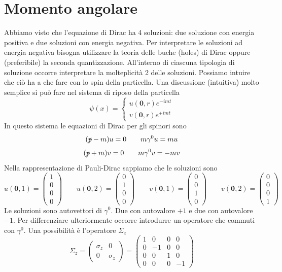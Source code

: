 \section{Momento angolare}
Abbiamo visto che l'equazione di Dirac ha 4 soluzioni: due soluzione con energia positiva e due soluzioni con energia negativa. Per interpretare le soluzioni ad energia negativa bisogna utilizzare la teoria delle buche (holes) di Dirac oppure (preferibile) la seconda quantizzazione. All'interno di ciascuna tipologia di soluzione occorre interpretare la molteplicità 2 delle soluzioni. Possiamo intuire che ciò ha a che fare con lo spin della particella. Una discussione (intuitiva) molto semplice si può fare nel sistema di riposo della particella
$$
\psi(x) = \begin{cases} u(\mathbf{0}, r) e^{-imt} \\ v(\mathbf{0}, r) e^{+imt} \end{cases}
$$
In questo sistema le equazioni di Dirac per gli spinori sono
$$
(\slashed{p} - m)u = 0 \qquad m\gamma^0 u = mu
$$
$$
(\slashed{p} + m)v = 0 \qquad m\gamma^0 v = -mv
$$
Nella rappresentazione di Pauli-Dirac sappiamo che le soluzioni sono
$$
u(\mathbf{0}, 1) = \begin{pmatrix} 1 \\ 0 \\ 0 \\ 0 \end{pmatrix} \qquad u(\mathbf{0}, 2) = \begin{pmatrix} 0 \\ 1 \\ 0 \\ 0 \end{pmatrix} \qquad v(\mathbf{0}, 1) = \begin{pmatrix} 0 \\ 0 \\ 1 \\ 0 \end{pmatrix} \qquad v(\mathbf{0}, 2) = \begin{pmatrix} 0 \\ 0 \\ 0 \\ 1 \end{pmatrix}
$$
Le soluzioni sono autovettori di $\gamma^0$. Due con autovalore $+1$ e due con autovalore $-1$. Per differenziare ulteriormente occorre introdurre un operatore che commuti con $\gamma^0$. Una possibilità è l'operatore $\Sigma_z$
$$
\Sigma_z = \begin{pmatrix} \sigma_z & 0 \\ 0 & \sigma_z \end{pmatrix} = \begin{pmatrix} 1 & 0 & 0 & 0 \\ 0 & -1 & 0 & 0 \\ 0 & 0 & 1 & 0 \\ 0 & 0 & 0 & -1 \end{pmatrix}
$$
